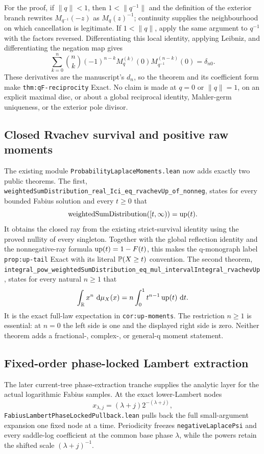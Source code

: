 \documentclass[11pt,oneside]{article}
\theoremstyle{definition}
\theoremstyle{remark}
\begin{document}
For the proof, if \(\lVert q\rVert<1\), then
\(1<\lVert q^{-1}\rVert\) and the definition of the exterior branch rewrites
\(M_{q^{-1}}(-z)\) as \(M_q(z)^{-1}\); continuity supplies the neighbourhood
on which cancellation is legitimate.  If \(1<\lVert q\rVert\), apply the same
argument to \(q^{-1}\) with the factors reversed.  Differentiating this local
identity, applying Leibniz, and differentiating the negation map gives
\[
 \sum_{k=0}^{n}\binom nk(-1)^{n-k}
 M_q^{(k)}(0)M_{q^{-1}}^{(n-k)}(0)=\delta_{n0}.
\]
These derivatives are the manuscript's \(d_n\), so the theorem and its
coefficient form make \nolinkurl{thm:qF-reciprocity} Exact.  No claim is made
at \(q=0\) or \(\lVert q\rVert=1\), on an explicit maximal disc, or about a
global reciprocal identity, Mahler-germ uniqueness, or the exterior pole
divisor.

\subsection{Closed Rvachev survival and positive raw moments}
The existing module \nolinkurl{ProbabilityLaplaceMoments.lean} now adds
exactly two public theorems.  The first,
\nolinkurl{weightedSumDistribution_real_Ici_eq_rvachevUp_of_nonneg}, states
for every bounded Fabius solution and every \(t\geq0\) that
\[
 \operatorname{weightedSumDistribution}([t,\infty))=\operatorname{up}(t).
\]
It obtains the closed ray from the existing strict-survival identity using
the proved nullity of every singleton.  Together with the global reflection
identity and the nonnegative-ray formula \(\operatorname{up}(t)=1-F(t)\), this makes
the q-monograph label \nolinkurl{prop:up-tail} Exact with its literal
\(\mathbb{P}(X\geq t)\) convention.  The second theorem,
\nolinkurl{integral_pow_weightedSumDistribution_eq_mul_intervalIntegral_rvachevUp},
states for every natural \(n\geq1\) that
\[
 \int_{\mathbb{R}}x^n\,\mathop{}\!\mathrm{d}\mu_X(x)
 =n\int_0^1t^{n-1}\operatorname{up}(t)\,\mathop{}\!\mathrm{d} t.
\]
It is the exact full-law expectation in \nolinkurl{cor:up-moments}.  The
restriction \(n\geq1\) is essential: at \(n=0\) the left side is one and the
displayed right side is zero.  Neither theorem adds a fractional-, complex-,
or general-q moment statement.

\subsection{Fixed-order phase-locked Lambert extraction}
The later current-tree phase-extraction tranche supplies the analytic layer
for the actual logarithmic Fabius samples.  At the exact lower-Lambert nodes
\[
  x_{\lambda,j}=(\lambda+j)2^{-(\lambda+j)},
\]
\nolinkurl{FabiusLambertPhaseLockedPullback.lean} pulls back the full
small-argument expansion one fixed node at a time.  Periodicity freezes
\nolinkurl{negativeLaplacePsi} and every saddle-log coefficient at the
common base phase \(\lambda\), while the powers retain the shifted scale
\((\lambda+j)^{-1}\).
\end{document}
